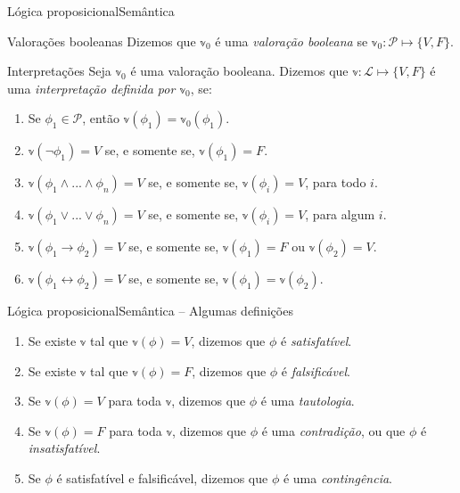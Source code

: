 \begin{frame}{Lógica proposicional}{Semântica}
	\vspace{-.3cm}
	\begin{footnotesize}
	\begin{block}{Valorações booleanas}
		Dizemos que $\mathbb{v}_0$ é uma \emph{valoração booleana} se $\mathbb{v}_0 : \mathcal{P} \longmapsto \{V,F \}$.
	\end{block}
	\pause
	\vspace{-.2cm}
	\begin{block}{Interpretações}
		Seja $\mathbb{v}_0$ é uma valoração booleana. Dizemos que $\mathbb{v} : \mathcal{L} \longmapsto \{V,F \}$ é uma \emph{interpretação definida por $\mathbb{v}_0$}, se:
		\begin{enumerate}
			\pause\item Se $\phi_1 \in \mathcal{P}$, então $\mathbb{v}(\phi_1) = \mathbb{v}_0(\phi_1)$.
			\pause\item $\mathbb{v}(\neg \phi_1) = V$ se, e somente se, $\mathbb{v}(\phi_1) = F$.
			\pause\item $\mathbb{v}(\phi_1 \wedge ... \wedge \phi_n) = V$ se, e somente se, $\mathbb{v}(\phi_i) = V$, para todo $i$.
			\pause\item $\mathbb{v}(\phi_1 \vee ... \vee \phi_n) = V$ se, e somente se, $\mathbb{v}(\phi_i) = V$, para algum $i$.
			\pause\item $\mathbb{v}(\phi_1 \rightarrow \phi_2) = V$ se, e somente se, $\mathbb{v}(\phi_1) = F$ ou $\mathbb{v}(\phi_2) = V$.
			\pause\item $\mathbb{v}(\phi_1 \leftrightarrow \phi_2) = V$ se, e somente se, $\mathbb{v}(\phi_1) = \mathbb{v}(\phi_2)$.
		\end{enumerate}
	\end{block}
	\end{footnotesize}
\end{frame}

\begin{frame}{Lógica proposicional}{Semântica -- Algumas definições}
	\begin{enumerate}
		\item Se existe $\mathbb{v}$ tal que $\mathbb{v}(\phi) = V$, dizemos que $\phi$ é \emph{satisfatível}.
		\pause\item Se existe $\mathbb{v}$ tal que $\mathbb{v}(\phi) = F$, dizemos que $\phi$ é \emph{falsificável}.
		\pause\item Se $\mathbb{v}(\phi) = V$ para toda $\mathbb{v}$, dizemos que $\phi$ é uma \emph{tautologia}.
		\pause\item Se $\mathbb{v}(\phi) = F$ para toda $\mathbb{v}$, dizemos que $\phi$ é uma \emph{contradição}, ou que $\phi$ é \emph{insatisfatível}.
		\pause\item Se $\phi$ é satisfatível e falsificável, dizemos que $\phi$ é uma \emph{contingência}.
	\end{enumerate}
\end{frame}


